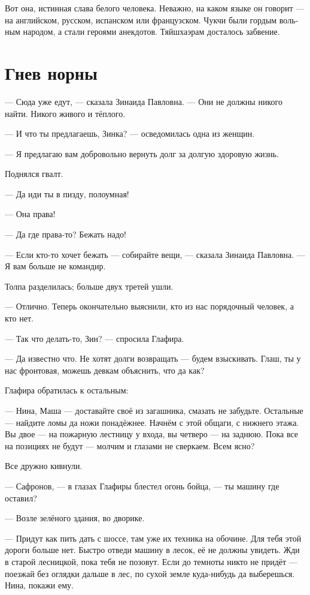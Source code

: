 \documentclass[a5paper,12pt,fleqn]{extbook}\usepackage{cooltooltips}\usepackage{polyglossia}\setdefaultlanguage[babelshorthands=true]{russian}\setotherlanguage{english}\defaultfontfeatures{Ligatures=TeX,Mapping=tex-text} \usepackage{xcolor}\definecolor{lightgray}{HTML}{bbbbbb}\color{lightgray}\newcommand{\ml}[3]{\textenglish{\textcolor{black}{#3}}}
\newcommand{\asterism}{\vspace{1em}{\centering\Large\bfseries$\ast~\ast~\ast$\par}\vspace{1em}}
\newcommand{\textspace}{\vspace{1em}{\centering\Large\bfseries<...>\par}\vspace{1em}}
\begin{document}
\asterism

\textspace

Вот она, истинная слава белого человека.
Неважно, на каком языке он говорит --- на английском, русском, испанском или французском.
Чукчи были гордым вольным народом, а стали героями анекдотов.
Тяйшхаэрам досталось забвение.

\chapter{Гнев норны}

\textspace

--- Сюда уже едут, --- сказала Зинаида Павловна.
--- Они не должны никого найти.
Никого живого и тёплого.

--- И что ты предлагаешь, Зинка? --- осведомилась одна из женщин.

--- Я предлагаю вам добровольно вернуть долг за долгую здоровую жизнь.

Поднялся гвалт.

--- Да иди ты в пизду, полоумная!

--- Она права!

--- Да где права-то?
Бежать надо!

--- Если кто-то хочет бежать --- собирайте вещи, --- сказала Зинаида Павловна.
--- Я вам больше не командир.

Толпа разделилась;
больше двух третей ушли.

--- Отлично.
Теперь окончательно выяснили, кто из нас порядочный человек, а кто нет.

--- Так что делать-то, Зин? --- спросила Глафира.

--- Да известно что.
Не хотят долги возвращать --- будем взыскивать.
Глаш, ты у нас фронтовая, можешь девкам объяснить, что да как?

Глафира обратилась к остальным:

--- Нина, Маша --- доставайте своё из загашника, смазать не забудьте.
Остальные --- найдите ломы да ножи понадёжнее.
Начнём с этой общаги, с нижнего этажа.
Вы двое --- на пожарную лестницу у входа, вы четверо --- на заднюю.
Пока все на позициях не будут --- молчим и глазами не сверкаем.
Всем ясно?

Все дружно кивнули.

--- Сафронов, --- в глазах Глафиры блестел огонь бойца, --- ты машину где оставил?

--- Возле зелёного здания, во дворике.

--- Придут как пить дать с шоссе, там уже их техника на обочине.
Для тебя этой дороги больше нет.
Быстро отведи машину в лесок, её не должны увидеть.
Жди в старой лесницкой, пока тебя не позовут.
Если до темноты никто не придёт --- поезжай без оглядки дальше в лес, по сухой земле куда-нибудь да выберешься.
Нина, покажи ему.
\end{document}
